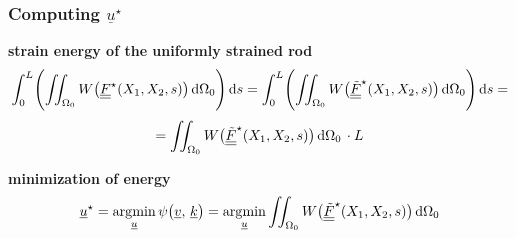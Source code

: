 \begin{frame}
  \frametitle{Computing $\underline{u}^{\star}$}

  \textbf{strain energy of the uniformly strained rod}
  \begin{displaymath}
    \int_0^L \Biggl( \iint_{\Omega_0} W \bigl( \doubleunderline{F}^{\star}(X_1,X_2,s) \bigr)  \dif \Omega_0 \Biggr) \dif s =
    \int_0^L \Biggl( \iint_{\Omega_0} W \bigl( \doubleunderline{\tilde{F}}^{\star}(X_1,X_2,s) \bigr)  \dif \Omega_0 \Biggr) \dif s =
  \end{displaymath}
  \begin{displaymath}
    = \iint_{\Omega_0} W \bigl( \doubleunderline{\tilde{F}}^{\star}(X_1,X_2,s) \bigr)  \dif \Omega_0 \, \cdot L
  \end{displaymath}

  \textbf{minimization of energy}
  \begin{displaymath}
    \underline{u}^{\star} =
    \argmin_{\underline{u}} \psi \bigl( \underline{v}, \, \underline{k} \bigr) =
    \argmin_{\underline{u}} \iint_{\Omega_0} W \bigl( \doubleunderline{\tilde{F}}^{\star}(X_1,X_2,s) \bigr)  \dif \Omega_0
  \end{displaymath}
\end{frame}

